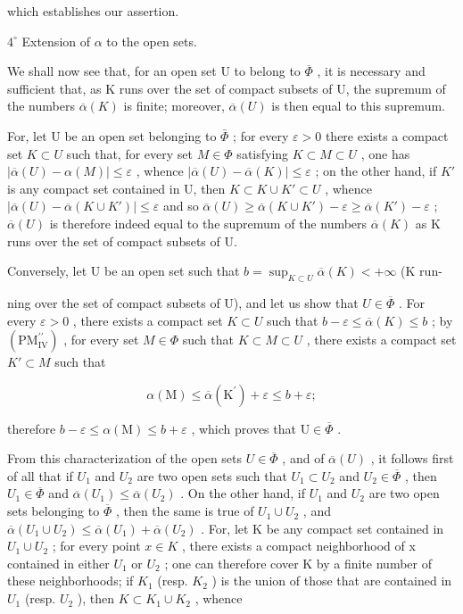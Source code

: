which establishes our assertion.

\(4^{\circ}\) Extension of \(\alpha\) to the open sets.

We shall now see that, for an open set U to belong to \(\overline{\Phi}\) , it is necessary and sufficient that, as K runs over the set of compact subsets of U, the supremum of the numbers \(\overline{\alpha}(K)\) is finite; moreover, \(\overline{\alpha}(U)\) is then equal to this supremum.

For, let U be an open set belonging to \(\bar{\Phi}\) ; for every \(\varepsilon > 0\) there exists a compact set \(K \subset U\) such that, for every set \(M \in \Phi\) satisfying \(K \subset M \subset U\) , one has \(|\overline{\alpha}(U) - \alpha(M)| \leqslant \varepsilon\) , whence \(|\overline{\alpha}(U) - \overline{\alpha}(K)| \leqslant \varepsilon\) ; on the other hand, if \(K'\) is any compact set contained in U, then \(K \subset K \cup K' \subset U\) , whence \(|\overline{\alpha}(U) - \overline{\alpha}(K \cup K')| \leqslant \varepsilon\) and so \(\overline{\alpha}(U) \geqslant \overline{\alpha}(K \cup K') - \varepsilon \geqslant \overline{\alpha}(K') - \varepsilon\) ; \(\overline{\alpha}(U)\) is therefore indeed equal to the supremum of the numbers \(\overline{\alpha}(K)\) as K runs over the set of compact subsets of U.

Conversely, let U be an open set such that \(b = \sup_{K \subset U} \overline{\alpha}(K) < +\infty\) (K run-

ning over the set of compact subsets of U), and let us show that \(U \in \overline{\Phi}\) . For every \(\varepsilon > 0\) , there exists a compact set \(K \subset U\) such that \(b - \varepsilon \leqslant \overline{\alpha}(K) \leqslant b\) ; by \((\mathrm{PM}_{\mathrm{IV}}^{\prime\prime})\) , for every set \(M \in \Phi\) such that \(K \subset M \subset U\) , there exists a compact set \(K' \subset M\) such that

\[
\alpha (\mathrm{M}) \leqslant \overline {{{{\alpha}}}} (\mathrm{K} ^ {\prime}) + \varepsilon \leqslant b + \varepsilon ;
\]

therefore \(b - \varepsilon \leqslant \alpha (\mathrm{M}) \leqslant b + \varepsilon\) , which proves that \(\mathrm{U} \in \overline{\Phi}\) .

From this characterization of the open sets \(U \in \overline{\Phi}\) , and of \(\overline{\alpha}(U)\) , it follows first of all that if \(U_{1}\) and \(U_{2}\) are two open sets such that \(U_{1} \subset U_{2}\) and \(U_{2} \in \overline{\Phi}\) , then \(U_{1} \in \overline{\Phi}\) and \(\overline{\alpha}(U_{1}) \leqslant \overline{\alpha}(U_{2})\) . On the other hand, if \(U_{1}\) and \(U_{2}\) are two open sets belonging to \(\overline{\Phi}\) , then the same is true of \(U_{1} \cup U_{2}\) , and \(\overline{\alpha}(U_{1} \cup U_{2}) \leqslant \overline{\alpha}(U_{1}) + \overline{\alpha}(U_{2})\) . For, let K be any compact set contained in \(U_{1} \cup U_{2}\) ; for every point \(x \in K\) , there exists a compact neighborhood of x contained in either \(U_{1}\) or \(U_{2}\) ; one can therefore cover K by a finite number of these neighborhoods; if \(K_{1}\) (resp. \(K_{2}\) ) is the union of those that are contained in \(U_{1}\) (resp. \(U_{2}\) ), then \(K \subset K_{1} \cup K_{2}\) , whence

